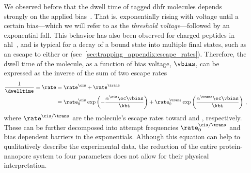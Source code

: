 We observed before that the dwell time of tagged \gls{dhfr} molecules depends strongly on the applied
bias~\cite{Biesemans-2015}. That is, exponentially rising with voltage until a certain bias---which we will
refer to as the \emph{threshold voltage}---followed by an exponential fall. This behavior has also been
observed for charged peptides in \gls{ahl}~\cite{Movileanu-2005}, and is typical for a decay of a bound state
into multiple final states, such as an escape to either \cisi{} or \transi{}
(see~\cref{sec:trapping_appendix:escape_rates}). Therefore, the dwell time of the molecule, as a function of
bias voltage, $\vbias$, can be expressed as the inverse of the sum of two escape rates~\cite{Movileanu-2005}
%
\begin{align}\label{eq:double_barrier_simple}
  \dfrac{1}{\dwelltime} = \rate ={}& \rate^\cis + \rate^\trans \\
    ={}&
    \rate^\cis_0 \exp \left( -\dfrac{\alpha^\cis \ec \vbias}{\kbt} \right) +
    \rate^\trans_0 \exp \left( \dfrac{\alpha^\trans \ec \vbias}{\kbt} \right)
  \text{ ,}
\end{align}
%
where $\rate^{\cis/\trans}$ are the molecule's escape rates toward \cisi{} and \transi{}, respectively. These
can be further decomposed into attempt frequencies $\rate^{\cis/\trans}_0$ and bias dependent barriers in the
exponentials. Although this equation can help to qualitatively describe the experimental data, the reduction
of the entire protein-nanopore system to four parameters does not allow for their physical interpretation.

